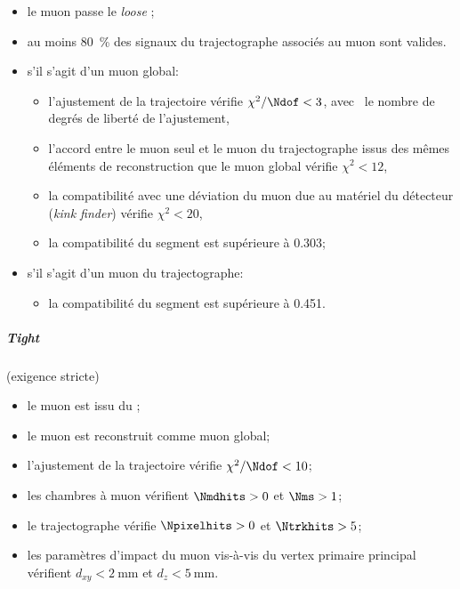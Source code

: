 \begin{itemize}
\item le muon passe le \emph{loose} \muonID;
\item au moins \SI{80}{\%} des signaux du trajectographe associés au muon sont valides.
\item s'il s'agit d'un muon global:
\begin{itemize}
\item l'ajustement de la trajectoire vérifie $\chi^2/\Ndof<3$, avec \Ndof\ le nombre de degrés de liberté de l'ajustement,
\item l'accord entre le muon seul et le muon du trajectographe issus des mêmes éléments de reconstruction que le muon global vérifie $\chi^2<12$,
\item la compatibilité avec une déviation du muon due au matériel du détecteur (\emph{kink finder}) vérifie $\chi^2<20$,
\item la compatibilité du segment est supérieure à \num{0.303};
\end{itemize}
\item s'il s'agit d'un muon du trajectographe:
\begin{itemize}
\item la compatibilité du segment est supérieure à \num{0.451}.
\end{itemize}
\end{itemize}
\subparagraph{\emph{Tight} \muonID} (exigence stricte)
\begin{itemize}
\item le muon est issu du \PF;
\item le muon est reconstruit comme muon global;
\item l'ajustement de la trajectoire vérifie $\chi^2/\Ndof<10$;
\item les chambres à muon vérifient $\Nmdhits>0$ et $\Nms>1$;
\item le trajectographe vérifie $\Npixelhits>0$ et $\Ntrkhits>5$;
\item les paramètres d'impact du muon vis-à-vis du vertex primaire principal vérifient $d_{xy} < \SI{2}{\milli\meter}$ et $d_z<\SI{5}{\milli\meter}$.
\end{itemize}
